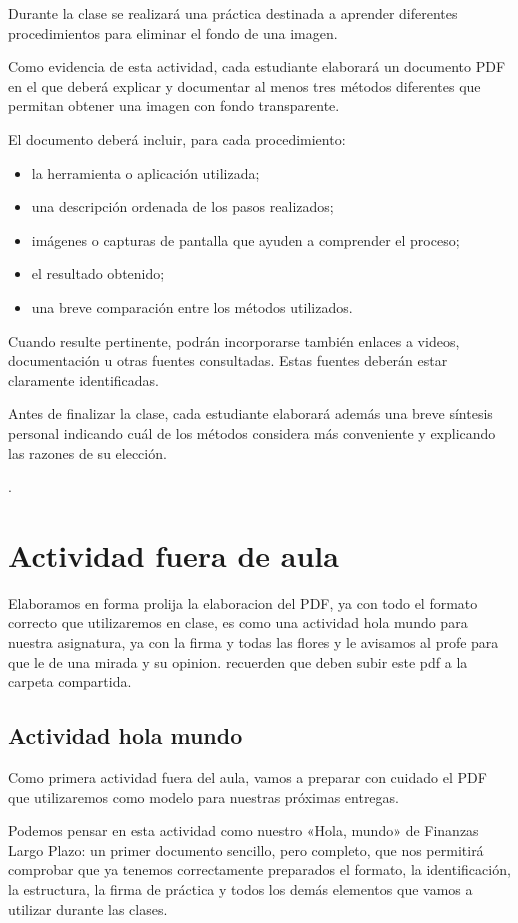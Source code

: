 \documentclass[12pt,a4paper]{article}
\begin{document}
Durante la clase se realizará una práctica destinada a aprender diferentes procedimientos para eliminar el fondo de una imagen.

Como evidencia de esta actividad, cada estudiante elaborará un documento PDF en el que deberá explicar y documentar al menos tres métodos diferentes que permitan obtener una imagen con fondo transparente.

El documento deberá incluir, para cada procedimiento:

\begin{itemize}
\item la herramienta o aplicación utilizada;
\item una descripción ordenada de los pasos realizados;
\item imágenes o capturas de pantalla que ayuden a comprender el proceso;
\item el resultado obtenido;
\item una breve comparación entre los métodos utilizados.
\end{itemize}

Cuando resulte pertinente, podrán incorporarse también enlaces a videos, documentación u otras fuentes consultadas. Estas fuentes deberán estar claramente identificadas.

Antes de finalizar la clase, cada estudiante elaborará además una breve síntesis personal indicando cuál de los métodos considera más conveniente y explicando las razones de su elección.

.

\section{Actividad fuera de aula}
Elaboramos en forma prolija la elaboracion del PDF, ya con todo el formato correcto que utilizaremos en clase, es como una actividad hola mundo para nuestra asignatura, ya con la firma y todas las flores y le avisamos al profe para que le de una mirada y su opinion. recuerden que deben subir este pdf a la carpeta compartida.

\subsection{Actividad hola mundo}

Como primera actividad fuera del aula, vamos a preparar con cuidado el PDF que utilizaremos como modelo para nuestras próximas entregas.

Podemos pensar en esta actividad como nuestro «Hola, mundo» de Finanzas Largo Plazo: un primer documento sencillo, pero completo, que nos permitirá comprobar que ya tenemos correctamente preparados el formato, la identificación, la estructura, la firma de práctica y todos los demás elementos que vamos a utilizar durante las clases.
\end{document}

